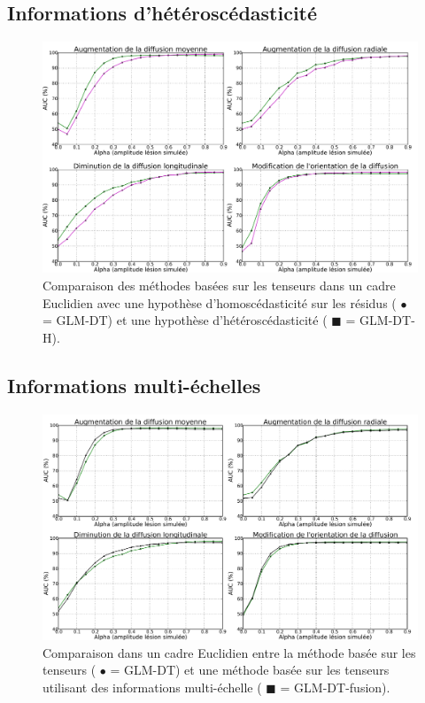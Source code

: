 \subsection{Informations d'hétéroscédasticité}
\begin{figure}[t]
    \centering
    \includegraphics[width=1\textwidth]{Images/AUC_hetero_gaussian8_fr.pdf}
    \caption{\label{fig:res_hetero} Comparaison des méthodes basées sur les tenseurs dans un cadre Euclidien avec une hypothèse d'homoscédasticité sur les résidus ({\color{green} $\bullet$ = GLM-DT})
    et une hypothèse d'hétéroscédasticité ({\color{magenta} $\blacksquare$ = GLM-DT-H}).}
\end{figure}

\subsection{Informations multi-échelles}
\begin{figure}[t]
    \centering
    \includegraphics[width=1\textwidth]{Images/AUC_multiscale_gaussian8_fr.pdf}
    \caption{\label{fig:res_multiscale} Comparaison dans un cadre Euclidien entre la méthode basée sur les tenseurs ({\color{green} $\bullet$ = GLM-DT})
    et une méthode basée sur les tenseurs utilisant des informations multi-échelle ({\color{black} $\blacksquare$ = GLM-DT-fusion}).}
\end{figure}

